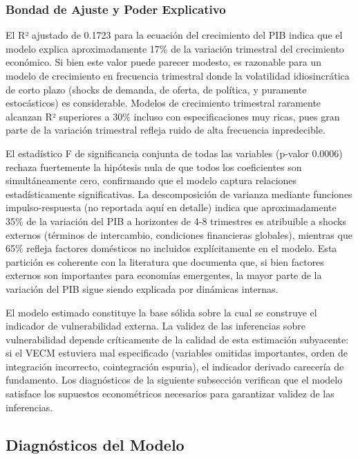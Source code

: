 \documentclass[3p,11pt,draft,natbib=false]{elsarticle}
\begin{document}
\subsubsection{Bondad de Ajuste y Poder Explicativo}

El R² ajustado de 0.1723 para la ecuación del crecimiento del PIB indica que el modelo explica aproximadamente 17\% de la variación trimestral del crecimiento económico. Si bien este valor puede parecer modesto, es razonable para un modelo de crecimiento en frecuencia trimestral donde la volatilidad idiosincrática de corto plazo (shocks de demanda, de oferta, de política, y puramente estocásticos) es considerable. Modelos de crecimiento trimestral raramente alcanzan R² superiores a 30\% incluso con especificaciones muy ricas, pues gran parte de la variación trimestral refleja ruido de alta frecuencia inpredecible.

El estadístico F de significancia conjunta de todas las variables (p-valor 0.0006) rechaza fuertemente la hipótesis nula de que todos los coeficientes son simultáneamente cero, confirmando que el modelo captura relaciones estadísticamente significativas. La descomposición de varianza mediante funciones impulso-respuesta (no reportada aquí en detalle) indica que aproximadamente 35\% de la variación del PIB a horizontes de 4-8 trimestres es atribuible a shocks externos (términos de intercambio, condiciones financieras globales), mientras que 65\% refleja factores domésticos no incluidos explícitamente en el modelo. Esta partición es coherente con la literatura que documenta que, si bien factores externos son importantes para economías emergentes, la mayor parte de la variación del PIB sigue siendo explicada por dinámicas internas.

El modelo estimado constituye la base sólida sobre la cual se construye el indicador de vulnerabilidad externa. La validez de las inferencias sobre vulnerabilidad depende críticamente de la calidad de esta estimación subyacente: si el VECM estuviera mal especificado (variables omitidas importantes, orden de integración incorrecto, cointegración espuria), el indicador derivado carecería de fundamento. Los diagnósticos de la siguiente subsección verifican que el modelo satisface los supuestos econométricos necesarios para garantizar validez de las inferencias.


\subsection{Diagnósticos del Modelo}
\label{sec:diagnosticos}
\end{document}
